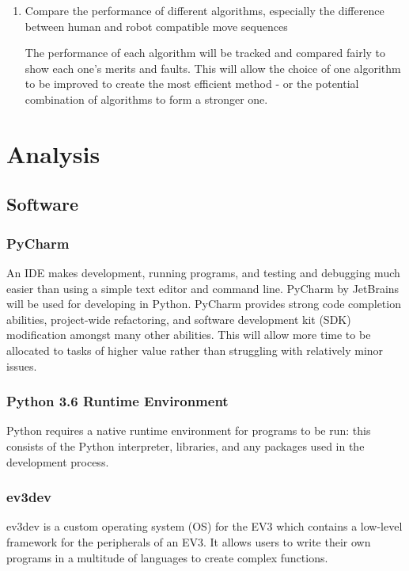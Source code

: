 \documentclass{report}
\begin{document}
\begin{enumerate}
    	\item Compare the performance of different algorithms, especially the difference between human and robot compatible move sequences \par The performance of each algorithm will be tracked and compared fairly to show each one's merits and faults. This will allow the choice of one algorithm to be improved to create the most efficient method - or the potential combination of algorithms to form a stronger one.
    \end{enumerate}
    
    \section{Analysis}
    \subsection{Software}
    
    \subsubsection{PyCharm}
    An IDE makes development, running programs, and testing and debugging much easier than using a simple text editor and command line. PyCharm by JetBrains \cite{JetBrains} will be used for developing in Python. PyCharm provides strong code completion abilities, project-wide refactoring, and software development kit (SDK) modification amongst many other abilities. This will allow more time to be allocated to tasks of higher value rather than struggling with relatively minor issues.
    
	\subsubsection{Python 3.6 Runtime Environment}
    Python requires a native runtime environment for programs to be run: this consists of the Python interpreter, libraries, and any packages used in the development process.
    
    \subsubsection{ev3dev}
    ev3dev \cite{Ev3dev.org} is a custom operating system (OS) for the EV3 which contains a low-level framework for the peripherals of an EV3. It allows users to write their own programs in a multitude of languages to create complex functions.
    
\end{document}
